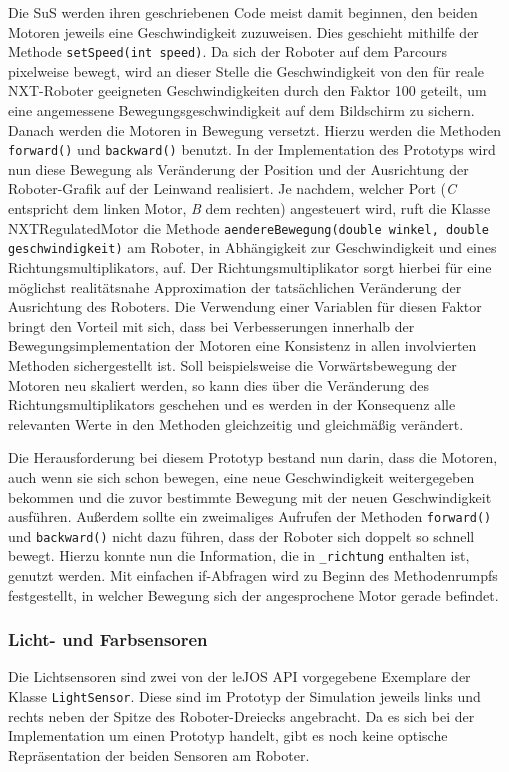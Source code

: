 \documentclass[paper=a4, DIV=14, BCOR=15mm, twoside=on, onecolumn=on, open = right, titlepage =on, parskip =half, headsepline = on, footsepline = on, chapterprefix = on, appendixprefix = off, fontsize = 12pt, numbers = noenddot, abstract = on]{scrbook}
\begin{document}
Die SuS werden ihren geschriebenen Code meist damit beginnen, den beiden Motoren jeweils eine Geschwindigkeit zuzuweisen. Dies geschieht mithilfe der Methode \texttt{setSpeed(int speed)}. Da sich der Roboter auf dem Parcours pixelweise bewegt, wird an dieser Stelle die Geschwindigkeit von den für reale NXT-Roboter geeigneten Geschwindigkeiten durch den Faktor 100 geteilt, um eine angemessene Bewegungsgeschwindigkeit auf dem Bildschirm zu sichern.\\
Danach werden die Motoren in Bewegung versetzt. Hierzu werden die Methoden\\
\texttt{forward()} und \texttt{backward()} benutzt. In der Implementation des Prototyps wird nun diese Bewegung als Veränderung der Position und der Ausrichtung der Roboter-Grafik auf der Leinwand realisiert. Je nachdem, welcher Port (\emph{C} entspricht dem linken Motor, \emph{B} dem rechten) angesteuert wird, ruft die Klasse NXTRegulatedMotor die Methode \texttt{aendereBewegung(double winkel, double geschwindigkeit)} am Roboter, in Abhängigkeit zur Geschwindigkeit und eines Richtungsmultiplikators, auf. Der Richtungsmultiplikator sorgt hierbei für eine möglichst realitätsnahe Approximation der tatsächlichen Veränderung der Ausrichtung des Roboters. Die Verwendung einer Variablen für diesen Faktor bringt den Vorteil mit sich, dass bei Verbesserungen innerhalb der Bewegungsimplementation der Motoren eine Konsistenz in allen involvierten Methoden sichergestellt ist. Soll beispielsweise die Vorwärtsbewegung der Motoren neu skaliert werden, so kann dies über die Veränderung des Richtungsmultiplikators geschehen und es werden in der Konsequenz alle relevanten Werte in den Methoden gleichzeitig und gleichmäßig verändert. 

Die Herausforderung bei diesem Prototyp bestand nun darin, dass die Motoren, auch wenn sie sich schon bewegen, eine neue Geschwindigkeit weitergegeben bekommen und die zuvor bestimmte Bewegung mit der neuen Geschwindigkeit ausführen. Außerdem sollte ein zweimaliges Aufrufen der Methoden \texttt{forward()} und \texttt{backward()} nicht dazu führen, dass der Roboter sich doppelt so schnell bewegt. Hierzu konnte nun die Information, die in  \texttt{{\_}richtung} enthalten ist, genutzt werden. Mit einfachen if-Abfragen wird zu Beginn des Methodenrumpfs festgestellt, in welcher Bewegung sich der angesprochene Motor gerade befindet. 


\subsubsection{Licht- und Farbsensoren}
Die Lichtsensoren sind zwei von der leJOS API vorgegebene Exemplare der Klasse \texttt{LightSensor}. Diese sind im Prototyp der Simulation jeweils  links und rechts neben der Spitze des Roboter-Dreiecks angebracht. Da es sich bei der Implementation um einen Prototyp handelt, gibt es noch keine optische Repräsentation der beiden Sensoren am Roboter. 
\end{document}
